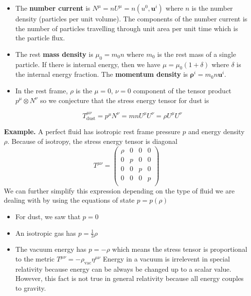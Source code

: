 \documentclass[11pt]{article}
\begin{document}
\begin{itemize}
    
    \item The \textbf{number current} is $N^{\mu} = nU^{\mu} = n(u^0, \mathbf{u}^i)$ where $n$ is the 
    number density (particles per unit volume). The components of the number current is the number of particles
    travelling through unit area per unit time which is the particle flux.

    \item The rest \textbf{mass density} is $\mu_0 = m_0n$ where $m_0$ is the rest mass of a single particle. If there
    is internal energy, then we have $\mu = \mu_0(1+\delta)$ where $\delta$ is the internal energy fraction. The \textbf{momentum density} 
    is $\mathbf{\rho}^i = m_0n\mathbf{u}^{i}$. 
    
    \item In the rest frame, \( \rho \) is the \( \mu = 0 \), \( \nu = 0 \) component of the tensor product \( p^{\mu} \otimes N^{\nu} \) so we conjecture
    that the stress energy tensor for dust is 
    
    \[ 
        T^{\mu\nu}_{\text{dust}} = p^{\mu}N^{\nu} = m n U^{\mu}U^{\nu} = \rho U^{\mu}U^{\nu} 
    \]
\end{itemize}

\noindent \textbf{Example.} A perfect fluid has isotropic rest frame pressure \( p \) and energy density \( \rho \). Because of isotropy, the stress energy tensor
is diagonal
\[ 
    T^{{\mu\nu}} = 
    \begin{pmatrix}
    \rho & 0 & 0 & 0 \\
    0 & p & 0 & 0 \\
    0 & 0 & p & 0 \\
    0 & 0 & 0 & p \\
    \end{pmatrix}
\]
We can further simplify this expression depending on the type of fluid we are dealing with by using the equations of state \( p = p(\rho) \)
\begin{itemize}
    \item For dust, we saw that \( p = 0 \)
    \item An isotropic gas has \( p = \frac{1}{3}\rho \)
    \item The vacuum energy has \( p = -\rho \) which means the stress tensor is proportional to the metric \( T^{\mu\nu} = -\rho_{\text{vac}}\eta^{\mu\nu} \)
    Energy in a vacuum is irrelevent in special relativity because energy can be always be changed up to a scalar value. However, this fact is not true in general relativity
    because all energy couples to gravity.
\end{itemize}
\end{document}
